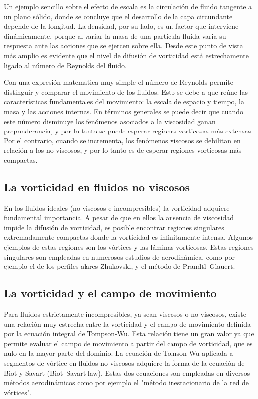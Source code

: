 \documentclass[12pt,twoside,onecolumn,openany]{article}
\begin{document}
Un ejemplo sencillo sobre el efecto de escala es la circulación de fluido tangente a un plano sólido, donde se concluye que el desarrollo de la capa circundante depende de la longitud. La densidad, por su lado, es un factor que interviene dinámicamente, porque al variar la masa de una partícula fluida varia su respuesta ante las acciones que se ejercen sobre ella. Desde este punto de vista más amplio es evidente que el nivel de difusión de vorticidad está estrechamente ligado al número de Reynolds del fluido.

Con una expresión matemática muy simple el número de Reynolds permite distinguir y comparar el movimiento de los fluidos. Esto se debe a que reúne las características fundamentales del movimiento: la escala de espacio y tiempo, la masa y las acciones internas. En términos generales se puede decir que cuando este número disminuye los fenómenos asociados a la viscosidad ganan preponderancia, y por lo tanto se puede esperar regiones vorticosas más extensas. Por el contrario, cuando se incrementa, los fenómenos viscosos se debilitan en relación a los no viscosos, y por lo tanto es de esperar regiones vorticosas más compactas.

\subsection{La vorticidad en fluidos no viscosos}

En los fluidos ideales (no viscosos e incompresibles) la vorticidad adquiere fundamental importancia. A pesar de que en ellos la ausencia de viscosidad impide la difusión de vorticidad, es posible encontrar regiones singulares extremadamente compactas donde la vorticidad es infinitamente intensa. Algunos ejemplos de estas regiones son los vórtices y las láminas vorticosas. Estas regiones singulares son empleadas en numerosos estudios de aerodinámica, como por ejemplo el de los perfiles alares Zhukovski, y el método de Prandtl–Glauert.

\subsection{La vorticidad y el campo de movimiento}

Para fluidos estrictamente incompresibles, ya sean viscosos o no viscosos, existe una relación muy estrecha entre la vorticidad y el campo de movimiento definida por la ecuación integral de Tompson-Wu. Esta relación tiene un gran valor ya que permite evaluar el campo de movimiento a partir del campo de vorticidad, que es nulo en la mayor parte del dominio. La ecuación de Tomson-Wu aplicada a segmentos de vórtice en fluidos no viscosos adquiere la forma de la ecuación de Biot y Savart (Biot–Savart law). Estas dos ecuaciones son empleadas en diversos métodos aerodinámicos como por ejemplo el "método inestacionario de la red de vórtices".
\end{document}

